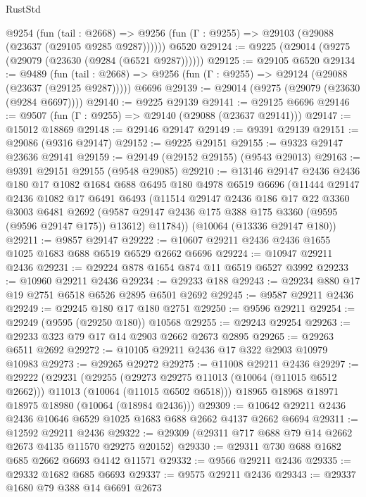 \begin{lexlean}{RustStd}
\begin{coremodule}
    @9254
      (fun (tail : @2668) =>
      @9256 (fun (Γ : @9255) => @29103 (@29088 (@23637 (@29105 @9285 @9287))))))
    @6520
@29124 := @9225 (@29014 (@9275 (@29079 (@23630 (@9284 (@6521 @9287))))))
@29125 := @29105 @6520
@29134 := @9489
    (fun (tail : @2668) => @9256 (fun (Γ : @9255) => @29124 (@29088 (@23637 (@29125 @9287)))))
    @6696
@29139 := @29014 (@9275 (@29079 (@23630 (@9284 @6697))))
@29140 := @9225 @29139
@29141 := @29125 @6696
@29146 := @9507 (fun (Γ : @9255) => @29140 (@29088 (@23637 @29141)))
@29147 := @15012 @18869
@29148 := @29146 @29147
@29149 := @9391 @29139
@29151 := @29086 (@9316 @29147)
@29152 := @9225 @29151
@29155 := @9323 @29147 @23636 @29141
@29159 := @29149 (@29152 @29155) (@9543 @29013)
@29163 := @9391 @29151 @29155 (@9548 @29085)
@29210 := @13146
    @29147
    @2436
    @2436
    @180
    @17
    @1082
    @1684
    @688
    @6495
    @180
    @4978
    @6519
    @6696
    (@11444
      @29147
      @2436
      @1082
      @17
      @6491
      @6493
      (@11514
        @29147
        @2436
        @186
        @17
        @22
        @3360
        @3003
        @6481
        @2692
        (@9587 @29147 @2436 @175 @388 @175 @3360 (@9595 (@9596 @29147 @175)) @13612)
        @11784))
    (@10064 (@13336 @29147 @180))
@29211 := @9857 @29147
@29222 := @10607 @29211 @2436 @2436 @1655 @1025 @1683 @688 @6519 @6529 @2662 @6696
@29224 := @10947 @29211 @2436
@29231 := @29224 @878 @1654 @874 @11 @6519 @6527 @3992
@29233 := @10960 @29211 @2436
@29234 := @29233 @188
@29243 := @29234 @880 @17 @19 @2751 @6518 @6526 @2895 @6501 @2692
@29245 := @9587 @29211 @2436
@29249 := @29245 @180 @17 @180 @2751
@29250 := @9596 @29211
@29254 := @29249 (@9595 (@29250 @180)) @10568
@29255 := @29243 @29254
@29263 := @29233 @323 @79 @17 @14 @2903 @2662 @2673 @2895
@29265 := @29263 @6511 @2692
@29272 := @10105 @29211 @2436 @17 @322 @2903 @10979 @10983
@29273 := @29265 @29272
@29275 := @11008 @29211 @2436
@29297 := @29222
    (@29231
      (@29255
        (@29273 @29275 @11013 (@10064 (@11015 @6512 @2662)))
        @11013
        (@10064 (@11015 @6502 @6518)))
      @18965
      @18968
      @18971
      @18975
      @18980
      (@10064 (@18984 @2436)))
@29309 := @10642 @29211 @2436 @2436 @10646 @6529 @1025 @1683 @688 @2662 @4137 @2662 @6694
@29311 := @12592 @29211 @2436
@29322 := @29309 (@29311 @717 @688 @79 @14 @2662 @2673 @4135 @11570 @29275 @20152)
@29330 := @29311 @730 @688 @1682 @685 @2662 @6693 @4142 @11571
@29332 := @9566 @29211 @2436
@29335 := @29332 @1682 @685 @6693
@29337 := @9575 @29211 @2436
@29343 := @29337 @1680 @79 @388 @14 @6691 @2673

\end{coremodule}
\end{lexlean}
